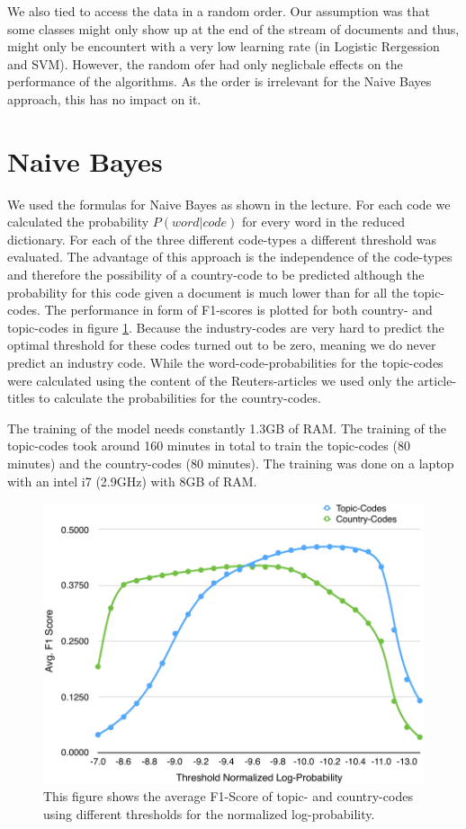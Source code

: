 \documentclass{article}
\begin{document}
We also tied to access the data in a random order. Our assumption was that some classes might only show up at the end of the stream of documents and thus, might only be encountert with a very low learning rate (in Logistic Rergession and SVM).
However, the random ofer had only neglicbale effects on the performance of the algorithms. As the order is irrelevant for the Naive Bayes approach, this has no impact on it.

\section*{Naive Bayes}
We used the formulas for Naive Bayes as shown in the lecture. For each code we calculated the probability $P(word | code)$ for every word in the reduced dictionary.
For each of the three different code-types a different threshold was evaluated. The advantage of this approach is the independence of the code-types and therefore the possibility of a country-code to be predicted although the probability for this code given a document is much lower than for all the topic-codes. The performance in form of F1-scores is plotted for both country- and topic-codes in figure \ref{fig_bayesThreshold}. Because the industry-codes are very hard to predict the optimal threshold for these codes turned out to be zero, meaning we do never predict an industry code.
While the word-code-probabilities for the topic-codes were calculated using the content of the Reuters-articles we used only the article-titles to calculate the probabilities for the country-codes. 

The training of the model needs constantly 1.3GB of RAM. The training of the topic-codes took around 160 minutes in total to train the topic-codes (80 minutes) and the country-codes (80 minutes). The training was done on a laptop with an intel i7 (2.9GHz) with 8GB of RAM.

\begin{figure}[h!]
    \centering
    \includegraphics[scale=0.6]{graphics/BayesF1ScoreTopicCountry.pdf}
    \caption{This figure shows the average F1-Score of topic- and country-codes using different thresholds for the normalized log-probability.}
    \label{fig_bayesThreshold}
\end{figure}
\end{document}
